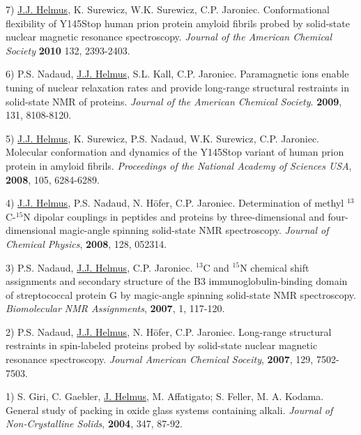 \documentclass[margin,line]{res}
\begin{document}
\begin{resume}
7) \underline{J.J. Helmus}, K. Surewicz, W.K. Surewicz, C.P. Jaroniec.
Conformational flexibility of Y145Stop human prion protein amyloid fibrils probed by
solid-state nuclear magnetic resonance spectroscopy.
{\em Journal of the American Chemical Society} {\bf 2010} 132, 2393-2403.

6) P.S. Nadaud, \underline{J.J. Helmus}, S.L. Kall, C.P. Jaroniec.
Paramagnetic ions enable tuning of nuclear relaxation rates and provide long-range structural
restraints in solid-state NMR of proteins.
{\em Journal of the American Chemical Society}. {\bf 2009}, 131, 8108-8120.

5) \underline{J.J. Helmus}, K. Surewicz, P.S. Nadaud, W.K. Surewicz, C.P. Jaroniec.
Molecular conformation and dynamics of the Y145Stop variant of human prion protein in
amyloid fibrils.
{\em Proceedings of the National Academy of Sciences USA}, {\bf 2008}, 105, 6284-6289.

4) \underline{J.J. Helmus}, P.S. Nadaud, N. H\"{o}fer, C.P. Jaroniec.
Determination of methyl $^{13}$C-$^{15}$N dipolar couplings in peptides and proteins by
three-dimensional and four-dimensional magic-angle spinning solid-state NMR spectroscopy.
{\em Journal of  Chemical Physics}, {\bf 2008}, 128, 052314.

3) P.S. Nadaud, \underline{J.J. Helmus}, C.P. Jaroniec.
$^{13}$C and $^{15}$N chemical shift assignments and secondary structure of the
B3 immunoglobulin-binding domain of streptococcal protein G by magic-angle spinning
solid-state NMR spectroscopy.
{\em Biomolecular NMR Assignments}, {\bf 2007}, 1, 117-120.

2) P.S. Nadaud, \underline{J.J. Helmus}, N. H\"{o}fer, C.P. Jaroniec.
Long-range structural restraints in spin-labeled proteins probed by solid-state nuclear magnetic
resonance spectroscopy.
{\em Journal American Chemical Soceity}, {\bf 2007}, 129, 7502-7503.

1) S. Giri, C. Gaebler, \underline{J. Helmus}, M. Affatigato; S. Feller, M. A. Kodama.
General study of packing in oxide glass systems containing alkali.
{\em Journal of Non-Crystalline Solids}, {\bf 2004}, 347, 87-92.


\end{resume}
\end{document}
